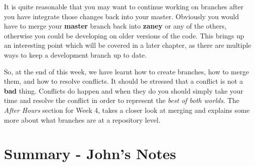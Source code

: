 It is quite reasonable that you may want to continue working on branches after you have integrate those changes back into your master.
Obviously you would have to merge your \textbf{master} branch back into \textbf{zaney} or any of the others, otherwise you could be developing on older versions of the code.
This brings up an interesting point which will be covered in a later chapter, as there are multiple ways to keep a development branch up to date.

So, at the end of this week, we have learnt how to create branches, how to merge them, and how to resolve conflicts.
It should be stressed that a conflict is not a \textbf{bad} thing.
Conflicts do happen and when they do you should simply take your time and resolve the conflict in order to represent the \emph{best of both worlds}.
The \emph{After Hours} section for Week 4, takes a closer look at merging and explains some more about what branches are at a repository level.

\clearpage

\section{Summary - John's Notes}
